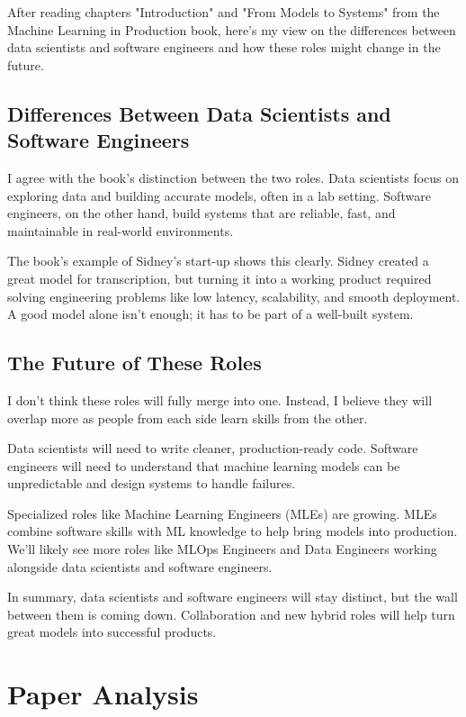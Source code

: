\documentclass[11pt]{article}
\begin{document}
After reading chapters "Introduction" and "From Models to Systems" from the Machine Learning in Production book, here’s my view on the differences between data scientists and software engineers and how these roles might change in the future.

\subsection{Differences Between Data Scientists and Software Engineers}

I agree with the book’s distinction between the two roles. Data scientists focus on exploring data and building accurate models, often in a lab setting. Software engineers, on the other hand, build systems that are reliable, fast, and maintainable in real-world environments.

The book’s example of Sidney’s start-up shows this clearly. Sidney created a great model for transcription, but turning it into a working product required solving engineering problems like low latency, scalability, and smooth deployment. A good model alone isn’t enough; it has to be part of a well-built system.

\subsection{The Future of These Roles}

I don’t think these roles will fully merge into one. Instead, I believe they will overlap more as people from each side learn skills from the other.

Data scientists will need to write cleaner, production-ready code. Software engineers will need to understand that machine learning models can be unpredictable and design systems to handle failures.

Specialized roles like Machine Learning Engineers (MLEs) are growing. MLEs combine software skills with ML knowledge to help bring models into production. We’ll likely see more roles like MLOps Engineers and Data Engineers working alongside data scientists and software engineers.

In summary, data scientists and software engineers will stay distinct, but the wall between them is coming down. Collaboration and new hybrid roles will help turn great models into successful products.

\section{Paper Analysis}
\end{document}
